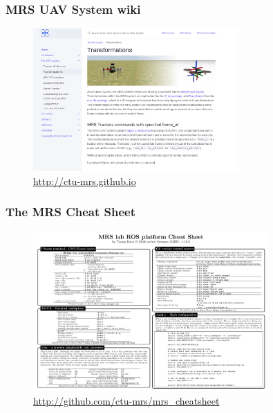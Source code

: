 \documentclass[aspectratio=1610]{beamer}
\begin{document}

  \begin{frame}
    \frametitle{MRS UAV System wiki}
    \begin{figure}
      \vspace{-1em}
      \caption*{\url{http://ctu-mrs.github.io}}
      \includegraphics[width=0.7\textwidth]{fig/wiki.png}
    \end{figure}

  \end{frame}



  \begin{frame}
    \frametitle{The MRS Cheat Sheet}
    \vspace{-1.0em}
    \begin{figure}
      \caption*{\url{http://github.com/ctu-mrs/mrs_cheatsheet}}
      \vspace{-0.5em}
      \includegraphics[width=0.8\textwidth]{fig/mrs_cheatsheet.png}
    \end{figure}

  \end{frame}
\end{document}

